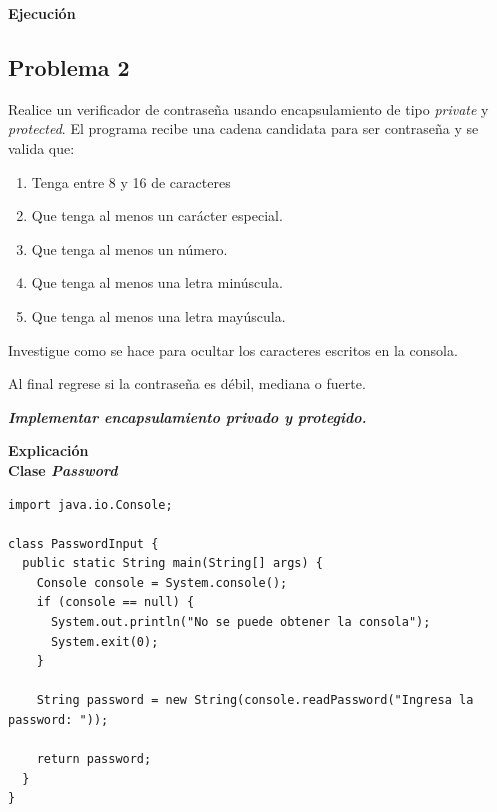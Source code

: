 \documentclass[11pt, twocolumn]{article}
\newcommand{\linejump}{\hfill \break}
\begin{document}

  \textbf{Ejecución}

  \subsection*{Problema 2}
  Realice un verificador de contraseña usando encapsulamiento de tipo \textit{private} y \textit{protected}. El programa recibe una cadena candidata para ser contraseña y se valida que:
  \begin{enumerate}[label=\alph*.]
    \item Tenga entre 8 y 16 de caracteres
    \item Que tenga al menos un carácter especial.
    \item Que tenga al menos un número.
    \item Que tenga al menos una letra minúscula.
    \item Que tenga al menos una letra mayúscula.
  \end{enumerate}
  Investigue como se hace para ocultar los caracteres escritos en la consola.

  Al final regrese si la contraseña es débil, mediana o fuerte.

  \textbf{\textit{Implementar encapsulamiento privado y protegido.}}

  \linejump
  \textbf{Explicación} \\


  \textbf{Clase \textit{Password}}
  \begin{lstlisting}
import java.io.Console;

class PasswordInput {
  public static String main(String[] args) {
    Console console = System.console();
    if (console == null) {
      System.out.println("No se puede obtener la consola");
      System.exit(0);
    }

    String password = new String(console.readPassword("Ingresa la password: "));

    return password;
  }
}
  \end{lstlisting}
\end{document}
